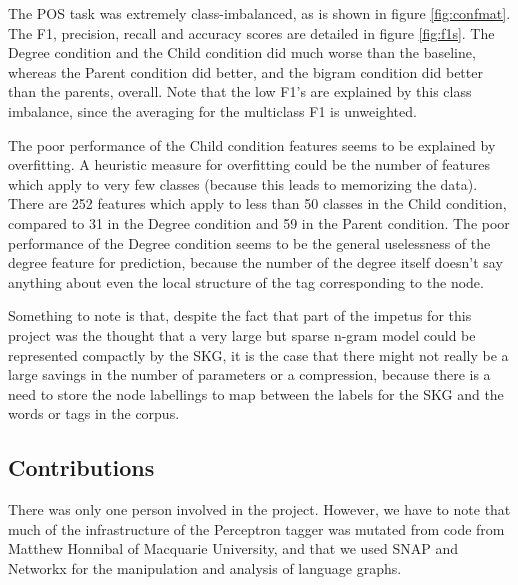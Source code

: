 \documentclass[12pt]{article}
\begin{document}
The POS task was extremely class-imbalanced, as is shown in figure \ref{fig:confmat}. The F1, precision, recall and accuracy scores are detailed in figure \ref{fig:f1s}. The Degree condition and the Child condition did much worse than the baseline, whereas the Parent condition did better, and the bigram condition did better than the parents, overall. Note that the low F1's are explained by this class imbalance, since the averaging for the multiclass F1 is unweighted.

The poor performance of the Child condition features seems to be explained by overfitting. A heuristic measure for overfitting could be the number of features which apply to very few classes (because this leads to memorizing the data). There are 252 features which apply to less than 50 classes in the Child condition, compared to 31 in the Degree condition and 59 in the Parent condition. The poor performance of the Degree condition seems to be the general uselessness of the degree feature for prediction, because the number of the degree itself doesn't say anything about even the local structure of the tag corresponding to the node.

Something to note is that, despite the fact that part of the impetus for this project was the thought that a very large but sparse n-gram model could be represented compactly by the SKG, it is the case that there might not really be a large savings in the number of parameters or a compression, because there is a need to store the node labellings to map between the labels for the SKG and the words or tags in the corpus.

\subsection*{Contributions}
There was only one person involved in the project. However, we have to note that much of the infrastructure of the Perceptron tagger was mutated from code from Matthew Honnibal of Macquarie University, and that we used SNAP and Networkx for the manipulation and analysis of language graphs. %

\end{document}
